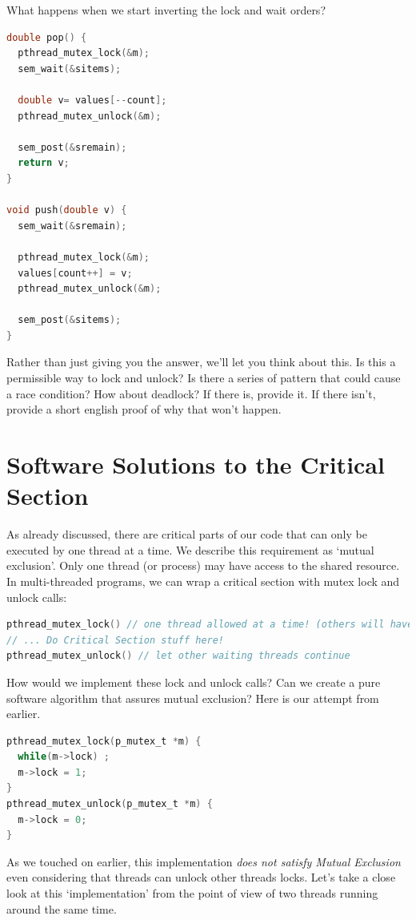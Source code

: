 What happens when we start inverting the lock and wait orders?

\begin{lstlisting}[language=C]
double pop() {
  pthread_mutex_lock(&m);
  sem_wait(&sitems);

  double v= values[--count];
  pthread_mutex_unlock(&m);

  sem_post(&sremain);
  return v;
}

void push(double v) {
  sem_wait(&sremain);

  pthread_mutex_lock(&m);
  values[count++] = v;
  pthread_mutex_unlock(&m);

  sem_post(&sitems);
}
\end{lstlisting}

Rather than just giving you the answer, we'll let you think about this.
Is this a permissible way to lock and unlock?
Is there a series of pattern that could cause a race condition?
How about deadlock?
If there is, provide it.
If there isn't, provide a short english proof of why that won't happen.

\section{Software Solutions to the Critical Section}

As already discussed, there are critical parts of our code that can only be executed by one thread at a time.
We describe this requirement as `mutual exclusion'.
Only one thread (or process) may have access to the shared resource.
In multi-threaded programs, we can wrap a critical section with mutex lock and unlock calls:

\begin{lstlisting}[language=C]
pthread_mutex_lock() // one thread allowed at a time! (others will have to wait here)
// ... Do Critical Section stuff here!
pthread_mutex_unlock() // let other waiting threads continue
\end{lstlisting}

How would we implement these lock and unlock calls?
Can we create a pure software algorithm that assures mutual exclusion?
Here is our attempt from earlier.

\begin{lstlisting}[language=C]
pthread_mutex_lock(p_mutex_t *m) {
  while(m->lock) ;
  m->lock = 1;
}
pthread_mutex_unlock(p_mutex_t *m) {
  m->lock = 0;
}
\end{lstlisting}

As we touched on earlier, this implementation \emph{does not satisfy Mutual Exclusion} even considering that threads can unlock other threads locks.
Let's take a close look at this `implementation' from the point of view of two threads running around the same time.

